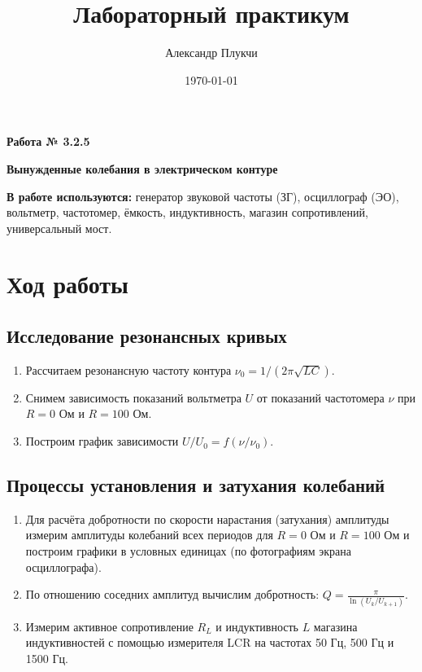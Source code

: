 \documentclass[a4paper,12pt]{article}
\author{Александр Плукчи}
\title{Лабораторный практикум}
\date{\today}
\begin{document}
	\textbf{Работа № 3.2.5}
	
	\textbf{\Large{Вынужденные колебания в электрическом контуре}}
	
	\textbf{В работе используются:} генератор звуковой частоты (ЗГ), осциллограф (ЭО), вольтметр, частотомер, ёмкость, индуктивность, магазин сопротивлений, универсальный мост.

	\section*{Ход работы}
		\subsection*{Исследование резонансных кривых}
			\begin{enumerate}
				\item Рассчитаем резонансную частоту контура $\nu_0 = 1/(2\pi\sqrt{LC})$.
				\item Снимем зависимость показаний вольтметра $U$ от показаний частотомера $\nu$ при $R = 0$ Ом и $R = 100$ Ом. 
				\item Построим график зависимости $U/U_0 = f(\nu/\nu_0)$.
			\end{enumerate}
		\subsection*{Процессы установления и затухания колебаний}
			\begin{enumerate}
				\item Для расчёта добротности по скорости нарастания (затухания) амплитуды измерим амплитуды колебаний всех периодов для $R = 0$ Ом и $R = 100$ Ом и построим графики в условных единицах (по фотографиям экрана осциллографа).
				\item По отношению соседних амплитуд вычислим добротность: $Q = \frac{\pi}{\ln{(U_k/U_{k+1})}}$.
				\item Измерим активное сопротивление $R_L$ и индуктивность $L$ магазина индуктивностей с помощью измерителя LCR на частотах 50 Гц, 500 Гц и 1500 Гц.
			\end{enumerate}
		
		
\end{document}
